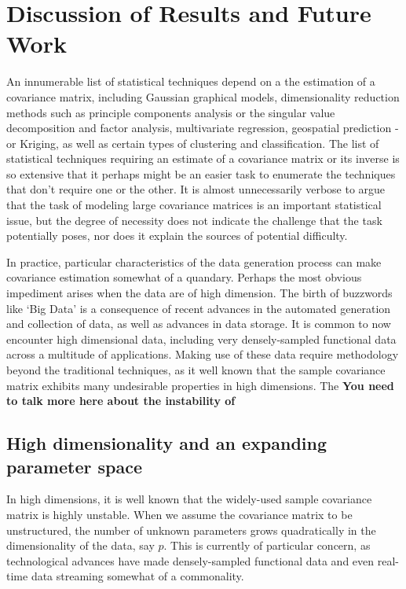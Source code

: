 \chapter{Discussion of Results and Future Work}
\label{end.ch}

An innumerable list of statistical techniques depend on a the estimation of a covariance matrix, including Gaussian graphical models, dimensionality reduction methods such as principle components analysis or the singular value decomposition and factor analysis, multivariate regression, geospatial prediction - or Kriging, as well as certain types of clustering and classification. The list of statistical techniques requiring an estimate of a covariance matrix or its inverse is so extensive that it perhaps might be an easier task to enumerate the techniques that don't require one or the other. It is almost unnecessarily verbose to argue that the task of modeling large covariance matrices is an important statistical issue, but the degree of necessity does not indicate the challenge that the task potentially poses, nor does it explain the sources of potential difficulty. 

In practice, particular characteristics of the data generation process can make covariance estimation somewhat of a quandary. Perhaps the most obvious impediment arises when the data are of high dimension. The birth of buzzwords like `Big Data'  is a consequence of recent advances in the automated generation and collection of data, as well as advances in data storage. It is common to now encounter high dimensional data, including very densely-sampled functional data across a multitude of applications. Making use of these data require methodology beyond the traditional techniques, as it well known that the sample covariance matrix exhibits many undesirable properties in high dimensions. The {\bf You need to talk more here about the instability of }


\section{High dimensionality and an expanding parameter space}

In high dimensions, it is well known that the widely-used sample covariance matrix is highly unstable. When we assume the covariance matrix to be unstructured, the number of unknown parameters grows quadratically in the dimensionality of the data, say $p$. This is currently of particular concern, as technological advances have made densely-sampled functional data and even real-time data streaming somewhat of a commonality. 

